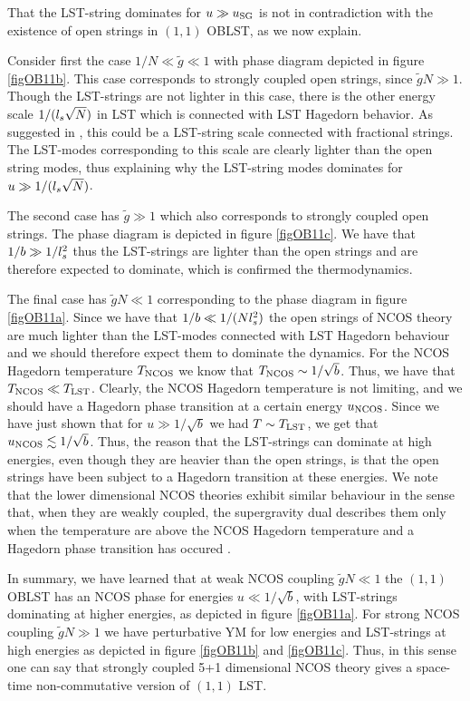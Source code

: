 \documentclass[a4paper,twoside,titlepage,12pt]{article}
\begin{document}
That the LST-string dominates for $u \gg u_{\rm SG}$ 
is not in contradiction with the existence of open strings
in $(1,1)$ OBLST, as we now explain.

Consider first the case \( 1/N \ll \tilde{g} \ll 1 \) with phase
diagram depicted in figure \ref{figOB11b}.
This case corresponds to strongly coupled open strings, since 
\( \tilde{g} N \gg 1 \).
Though the LST-strings are not lighter in this case, there
is the other energy scale $1/(l_s \sqrt{N})$ in LST
which is connected with LST Hagedorn behavior. 
As suggested in \cite{Maldacena:1996ya,Harmark:2000hw}, 
this could be a LST-string scale
connected with fractional strings. 
The LST-modes corresponding to this scale are clearly lighter than
the open string modes, thus explaining why the
LST-string modes dominates for $u \gg 1/(l_s \sqrt{N})$.

The second case has \( \tilde{g} \gg 1 \) 
which also corresponds to strongly coupled open strings.
The phase diagram is depicted in figure \ref{figOB11c}.
We have that $1/b \gg 1/l_s^2$ thus the LST-strings are lighter
than the open strings and are therefore expected to dominate,
which is confirmed the thermodynamics.

The final case has $ \tilde{g} N \ll 1 $
corresponding to the phase diagram in figure \ref{figOB11a}.
Since we have that $1/b \ll 1/(Nl_s^2) $ the open strings of NCOS theory
are much lighter than the LST-modes connected with LST Hagedorn behaviour 
and we should therefore expect them to dominate the dynamics.
For the NCOS Hagedorn temperature $T_{\rm NCOS}$ we know that 
\( T_{\rm NCOS} \sim 1/\sqrt{b} \).
Thus, we have that $T_{\rm NCOS} \ll T_{\rm LST}$.
Clearly, the NCOS Hagedorn temperature is not limiting,
and we should have a Hagedorn phase transition at a certain energy
$u_{\rm NCOS}$.
Since we have just shown that for $u \gg 1/\sqrt{b}$
we had $T \sim T_{\rm LST}$, we get that $u_{\rm NCOS} \lesssim 1/\sqrt{b}$.
Thus, the reason that the LST-strings can dominate at high energies, 
even though they are heavier than the open strings, is that 
the open strings have been subject to a Hagedorn transition
at these energies.
We note that the lower dimensional NCOS theories exhibit similar behaviour
in the sense that, when they are weakly coupled, the supergravity dual
describes them only when the temperature are above the NCOS Hagedorn
temperature and a Hagedorn phase transition has occured \cite{Harmark:2000wv}.

In summary, we have learned that at weak NCOS coupling $\tilde{g} N \ll 1$ 
the $(1,1)$ OBLST has an NCOS phase for energies
$u \ll 1/\sqrt{b} $, with LST-strings dominating at higher energies, 
as depicted in figure \ref{figOB11a}.
For strong NCOS coupling $\tilde{g} N \gg 1$ we have
perturbative YM for low energies and LST-strings at high energies
as depicted in figure \ref{figOB11b} and \ref{figOB11c}.
Thus, in this sense one can say that strongly coupled 5+1 dimensional
NCOS theory gives a space-time non-commutative version of $(1,1)$ LST.
\end{document}
